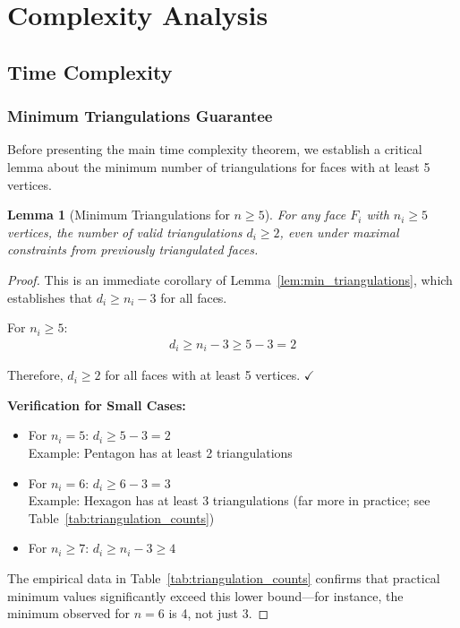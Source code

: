 \documentclass[12pt,a4paper]{article}
\newtheorem{lemma}[theorem]{Lemma}
\theoremstyle{definition}
\theoremstyle{remark}
\begin{document}
\section{Complexity Analysis}
\label{sec:complexity}

\subsection{Time Complexity}

\subsubsection{Minimum Triangulations Guarantee}

Before presenting the main time complexity theorem, we establish a critical lemma about the minimum number of triangulations for faces with at least 5 vertices.

\begin{lemma}[Minimum Triangulations for $n \geq 5$]
\label{lem:min_triangulations_n5}
For any face $F_i$ with $n_i \geq 5$ vertices, the number of valid triangulations $d_i \geq 2$, even under maximal constraints from previously triangulated faces.
\end{lemma}

\begin{proof}
This is an immediate corollary of Lemma~\ref{lem:min_triangulations}, which establishes that $d_i \geq n_i - 3$ for all faces.

For $n_i \geq 5$:
\begin{align}
d_i \geq n_i - 3 \geq 5 - 3 = 2
\end{align}

Therefore, $d_i \geq 2$ for all faces with at least 5 vertices. $\checkmark$

\textbf{Verification for Small Cases:}

\begin{itemize}
    \item For $n_i = 5$: $d_i \geq 5 - 3 = 2$ \\
    Example: Pentagon has at least 2 triangulations
    
    \item For $n_i = 6$: $d_i \geq 6 - 3 = 3$ \\
    Example: Hexagon has at least 3 triangulations (far more in practice; see Table~\ref{tab:triangulation_counts})
    
    \item For $n_i \geq 7$: $d_i \geq n_i - 3 \geq 4$
\end{itemize}

The empirical data in Table~\ref{tab:triangulation_counts} confirms that practical minimum values significantly exceed this lower bound—for instance, the minimum observed for $n = 6$ is 4, not just 3.
\end{proof}
\end{document}
